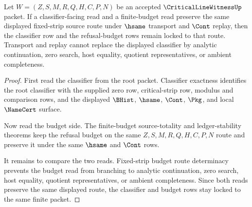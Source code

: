 \begin{theorem}
\label{thm:critical-line-witness-root-classifier-budget-lock}
Let $W=(Z,S,M,R,Q,H,C,P,N)$ be an accepted $\CriticalLineWitnessUp$ packet. If a classifier-facing read and a finite-budget read preserve the same displayed fixed-strip source route under $\hsame$ transport and $\Cont$ replay, then the classifier row and the refusal-budget rows remain locked to that route. Transport and replay cannot replace the displayed classifier by analytic continuation, zero search, host equality, quotient representatives, or ambient completeness.
\end{theorem}
\begin{proof}
First read the classifier from the root packet. Classifier exactness identifies the root classifier with the supplied zero row, critical-strip row, modulus and comparison rows, and the displayed $\BHist$, $\hsame$, $\Cont$, $\Pkg$, and local $\NameCert$ surface.

Now read the budget side. The finite-budget source-totality and ledger-stability theorems keep the refusal budget on the same $Z,S,M,R,Q,H,C,P,N$ route and preserve it under the same $\hsame$ and $\Cont$ rows.

It remains to compare the two reads. Fixed-strip budget route determinacy prevents the budget read from branching to analytic continuation, zero search, host equality, quotient representatives, or ambient completeness. Since both reads preserve the same displayed route, the classifier and budget rows stay locked to the same finite packet.
\end{proof}

